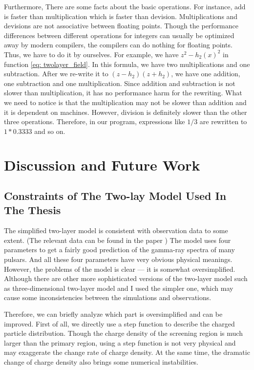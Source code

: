\documentclass[12pt]{report}
\begin{document}
          Furthermore, There are some facts about the basic operations. For instance, add is faster than 
          multiplication which is faster than devision. Multiplications and devisions are not associative
          between floating points. 
          Though the performance differences between different operations for integers can usually be 
          optimized 
          away by modern compilers, the compilers can do nothing for floating points. Thus, we have to do 
          it 
          by ourselves. For example, we have $z^2 - h_2\left(x\right)^2$ in function 
          \ref{eq: twolayer_field}.
          In this formula, we have two multiplications and one subtraction. After we re-write it to 
          $\left(z-h_2\right)\left(z + h_2\right)$, we have one addition, one subtraction and one 
          multiplication.
          Since addition and subtraction is not slower than multiplication, it has no performance harm 
          for the rewriting. What we need to notice is that the multiplication may not be slower than 
          addition
          and it is dependent on machines. However, division is definitely slower than the other three operations. 
          Therefore, in our program, expressions like $1 / 3$ are rewritten to $1*0.3333$ and so on.  

    \chapter{Discussion and Future Work}
      \section{Constraints of The Two-lay Model Used In The Thesis} 
        The simplified two-layer model is consistent with observation data to some extent. 
        (The relevant data can be found in the paper \cite{0004-637X-720-1-178})
        The model uses four parameters to get a fairly good prediction of the gamma-ray 
        spectra of many pulsars. And all these four parameters have very obvious physical 
        meanings. However, the problems of the model is clear --- it is somewhat 
        oversimplified. Although there are other more sophisticated versions of the 
        two-layer model such as three-dimensional two-layer model 
        \cite{doi:10.1111/j.1365-2966.2011.18577.x} and I used the simpler one, which may cause 
        some inconsistencies between the simulations and observations. 

        Therefore, we can briefly analyze which part is oversimplified and can be improved. 
        First of all, we directly use a step function to describe the charged particle 
        distribution. Though the charge density of the screening region is much larger than 
        the primary region, using a step function is not very physical and may exaggerate 
        the change rate of charge density. At the same time, the dramatic change of charge 
        density also brings some numerical instabilities.
\end{document}

